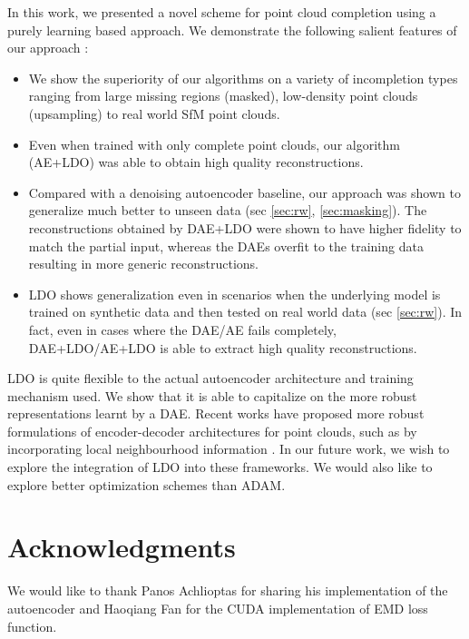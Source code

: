 \documentclass[10pt,twocolumn,letterpaper]{article}
\begin{document}
In this work, we presented a novel scheme for point cloud completion using a purely learning based approach. We demonstrate the following salient features of our approach : \begin{itemize}
    \item We show the superiority of our algorithms on a variety of incompletion types ranging from large missing regions (masked), low-density point clouds (upsampling) to real world SfM point clouds.
    \item Even when trained with only complete point clouds, our algorithm (AE+LDO) was able to obtain high quality reconstructions.
    \item Compared with a denoising autoencoder baseline, our approach was shown to generalize much better to unseen data (sec \ref{sec:rw}, \ref{sec:masking}). The reconstructions obtained by DAE+LDO were shown to have higher fidelity to match the partial input, whereas the DAEs overfit to the training data resulting in more generic reconstructions.
    \item LDO shows generalization even in scenarios when the underlying model is trained on synthetic data and then tested on real world data (sec \ref{sec:rw}). In fact, even in cases where the DAE/AE fails completely, DAE+LDO/AE+LDO is able to extract high quality reconstructions.

\end{itemize}
LDO is quite flexible to the actual autoencoder architecture and training mechanism used. We show that it is able to capitalize on the more robust representations learnt by a DAE. Recent works have proposed more robust formulations of encoder-decoder architectures for point clouds, such as by incorporating local neighbourhood information \cite{pnetplus,foldingnet,neighbours}. In our future work, we wish to explore the integration of LDO into these frameworks. We would also like to explore better optimization schemes than ADAM.

\section*{Acknowledgments} 
We would like to thank Panos Achlioptas for sharing his implementation of the autoencoder and Haoqiang Fan for the CUDA implementation of EMD loss function.
\end{document}
